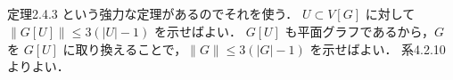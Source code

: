 \subsection{}
定理2.4.3 という強力な定理があるのでそれを使う．
$U\subset V[G]$ に対して $\|G[U]\|\leq 3(|U|-1)$ を示せばよい．
$G[U]$ も平面グラフであるから，$G$ を $G[U]$ に取り換えることで，$\|G\|\leq 3(|G| - 1)$ を示せばよい．
系4.2.10 よりよい． 
